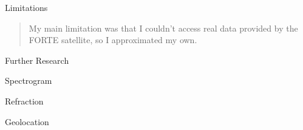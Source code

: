 \documentclass[10pt, aspectratio=168]{beamer}
\begin{document}
    \begin{frame}{Limitations}
        \begin{quote}
            \Large{My main limitation was that I couldn't access real data provided by the FORTE satellite, so I approximated my own.}
        \end{quote}
    \end{frame}
    
    \begin{frame}{Further Research}
        \begin{itemize}
            \item \huge{Spectrogram
            \item Refraction
            \item Geolocation}
        \end{itemize}
    \end{frame}
   
\end{document}
